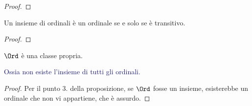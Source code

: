 \documentclass[11pt]{scrartcl}
\begin{document}
\begin{proof}
	
\end{proof}

\begin{corollary}
	Un insieme di ordinali è un ordinale se e solo se è transitivo.
\end{corollary}

\begin{proof}

\end{proof}

\begin{corollary}
	$\Ord$ è una classe propria.
\end{corollary}

\textcolor{MidnightBlue}{Ossia non esiste l'insieme di tutti gli ordinali.}

\begin{proof}
	Per il punto 3. della proposizione, se $\Ord$ fosse un insieme, esisterebbe un ordinale che non vi appartiene, che è assurdo.
\end{proof}
\end{document}
